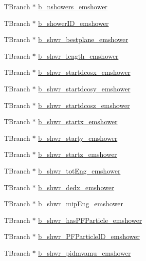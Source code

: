 \begin{DoxyCompactItemize}
T\-Branch $\ast$ \hyperlink{classanatree_a3ea35b914b9a6a2ccdfdab81dcf12c67}{b\-\_\-nshowers\-\_\-emshower}
\item 
T\-Branch $\ast$ \hyperlink{classanatree_a77b3777c94e70442c12270e7045e76e4}{b\-\_\-shower\-I\-D\-\_\-emshower}
\item 
T\-Branch $\ast$ \hyperlink{classanatree_af213943a244b6f731b213cd36abbb195}{b\-\_\-shwr\-\_\-bestplane\-\_\-emshower}
\item 
T\-Branch $\ast$ \hyperlink{classanatree_a93216be71fcdf8493a2ae993480ec3ab}{b\-\_\-shwr\-\_\-length\-\_\-emshower}
\item 
T\-Branch $\ast$ \hyperlink{classanatree_add9e4238d8e87385ce64f1e198245c53}{b\-\_\-shwr\-\_\-startdcosx\-\_\-emshower}
\item 
T\-Branch $\ast$ \hyperlink{classanatree_ab78dad7cb33a332bf20454f996f5b313}{b\-\_\-shwr\-\_\-startdcosy\-\_\-emshower}
\item 
T\-Branch $\ast$ \hyperlink{classanatree_a737d92ea209d6781ad2e19c0226fb812}{b\-\_\-shwr\-\_\-startdcosz\-\_\-emshower}
\item 
T\-Branch $\ast$ \hyperlink{classanatree_a6a4a697380f1cf7e86523b1a95fffdb9}{b\-\_\-shwr\-\_\-startx\-\_\-emshower}
\item 
T\-Branch $\ast$ \hyperlink{classanatree_a355fe52b10b8524f8a73a5911e3b2b1d}{b\-\_\-shwr\-\_\-starty\-\_\-emshower}
\item 
T\-Branch $\ast$ \hyperlink{classanatree_a9fbab35e3e5a399899623a72a1f46d60}{b\-\_\-shwr\-\_\-startz\-\_\-emshower}
\item 
T\-Branch $\ast$ \hyperlink{classanatree_a6b521c29eb6389af9ad60e74a7d22fd4}{b\-\_\-shwr\-\_\-tot\-Eng\-\_\-emshower}
\item 
T\-Branch $\ast$ \hyperlink{classanatree_a9b2ea44152c0c699e9b4132bfcd6f902}{b\-\_\-shwr\-\_\-dedx\-\_\-emshower}
\item 
T\-Branch $\ast$ \hyperlink{classanatree_a585bc84a73ab3d2aa971eb6ba987cd36}{b\-\_\-shwr\-\_\-mip\-Eng\-\_\-emshower}
\item 
T\-Branch $\ast$ \hyperlink{classanatree_a8f344f49b8aa1d29c0b8e546ccccb9df}{b\-\_\-shwr\-\_\-has\-P\-F\-Particle\-\_\-emshower}
\item 
T\-Branch $\ast$ \hyperlink{classanatree_a122fe315b2ea167d500d25ee92317d8a}{b\-\_\-shwr\-\_\-\-P\-F\-Particle\-I\-D\-\_\-emshower}
\item 
T\-Branch $\ast$ \hyperlink{classanatree_afd1eacf09d50860c598a41db1dc809ac}{b\-\_\-shwr\-\_\-pidmvamu\-\_\-emshower}
\item 

\end{DoxyCompactItemize}
